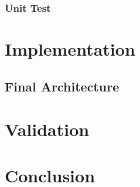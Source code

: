 \documentclass{article}
\begin{document}
\subsubsection{Unit Test}

\section{Implementation}

\subsection{Final Architecture}


\section{Validation}
\section{Conclusion}
\end{document}
